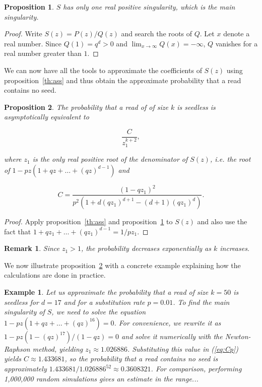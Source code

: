 \documentclass{article}
\newtheorem{example}{Example}
\newtheorem{proposition}{Proposition}
\newtheorem{remark}{Remark}
\begin{document}
\begin{proposition}
\label{th:roots}
$S$ has only one real positive singularity, which is the main singularity.
\end{proposition}

\begin{proof}
Write $S(z) = P(z)/Q(z)$ and search the roots of $Q$. Let $x$ denote a
real number. Since $Q(1) = q^d > 0$ and $\lim_{x\rightarrow \infty} Q(x) =
-\infty$, $Q$ vanishes for a real number greater than $1$.
\end{proof}

We can now have all the tools to approximate the coefficients of $S(z)$
using proposition~\ref{th:ass} and thus obtain the approximate probability
that a read contains no seed.

\begin{proposition}
\label{th:p}
The probability that a read of of size $k$ is seedless is
asymptotically equivalent to

\begin{equation*}
\frac{C}{z_1^{k+2}},
\end{equation*}

\noindent
where $z_1$ is the only real positive root of the denominator of $S(z)$,
\textit{i.e.} the root of $1-pz(1+qz+\ldots+(qz)^{d-1})$ and

\begin{equation}
\label{eq:Cp}
C =\frac{(1-qz_1)^2}{p^2\left( 1 + d(qz_1)^{d+1} - (d+1)(qz_1)^d
\right)}.
\end{equation}

\end{proposition}

\begin{proof}
Apply proposition~\ref{th:ass} and proposition~\ref{th:roots} to $S(z)$
and also use the fact that $1+qz_1+\ldots+(qz_1)^{d-1} = 1/pz_1$.
\end{proof}

\begin{remark}
Since $z_1 > 1$, the probability decreases exponentially
as $k$ increases.
\end{remark}

We now illustrate proposition~\ref{th:p} with a concrete example
explaining how the calculations are done in practice.

\begin{example}
\label{ex:num}
Let us approximate the probability that a read of size $k=50$ is seedless
for $d=17$ and for a substitution rate $p=0.01$. To find the main
singularity of $S$, we need to solve the equation
$1-pz(1+qz+\ldots+(qz)^{16}) = 0$. For convenience, we rewrite it as
$1-pz(1-(qz)^{17})/(1-qz) = 0$ and solve it numerically with the
Newton-Raphson method, yielding $z_1 \approx 1.026886$. Substituting this
value in (\ref{eq:Cp}) yields $C \approx 1.433681$, so the probability
that a read contains no seed is approximately $1.433681 / 1.026886^{52}
\approx 0.3608321$. For comparison, performing 1,000,000 random
simulations gives an estimate in the range...
\end{example}
\end{document}
